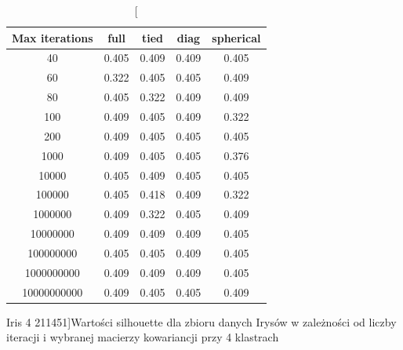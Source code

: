\documentclass{classrep}
\begin{document}
{{            \begin{table}[!htbp]
                \begin{minipage}{1\textwidth}
                \centering
                \begin{tabular}{|c|c|c|c|c|}
                \hline
                Max iterations & full & tied & diag & spherical \\ \hline
                40 & 0.405 & 0.409 & 0.409 & 0.405 \\ \hline
                60 & 0.322 & 0.405 & 0.405 & 0.409 \\ \hline
                80 & 0.405 & 0.322 & 0.409 & 0.409 \\ \hline
                100 & 0.409 & 0.405 & 0.409 & 0.322 \\ \hline
                200 & 0.409 & 0.405 & 0.405 & 0.405 \\ \hline
                1000 & 0.409 & 0.405 & 0.405 & 0.376 \\ \hline
                10000 & 0.405 & 0.409 & 0.405 & 0.405 \\ \hline
                100000 & 0.405 & 0.418 & 0.409 & 0.322 \\ \hline
                1000000 & 0.409 & 0.322 & 0.405 & 0.409 \\ \hline
                10000000 & 0.409 & 0.409 & 0.409 & 0.405 \\ \hline
                100000000 & 0.405 & 0.405 & 0.409 & 0.405 \\ \hline
                1000000000 & 0.409 & 0.409 & 0.409 & 0.405 \\ \hline
                10000000000 & 0.409 & 0.405 & 0.405 & 0.409 \\ \hline
                \end{tabular}
                \caption
                [Iris 4 211451]{Wartości silhouette dla zbioru danych Irysów w zależności od liczby iteracji i wybranej macierzy kowariancji przy 4 klastrach}
                \label{Iris_4_211451}
                \end{minipage}
                \hfill
    

\end{table}}}
\end{document}
